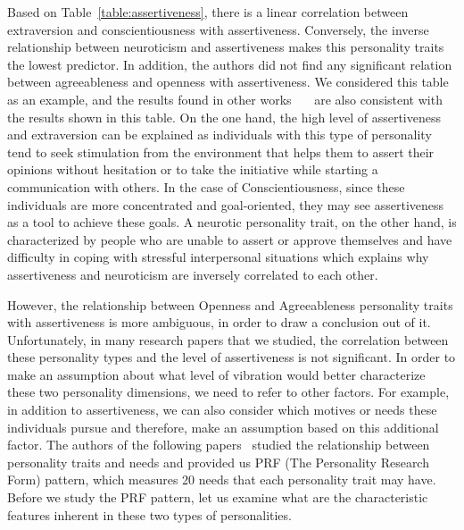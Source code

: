 \par Based on Table~\ref{table:assertiveness}, there is a linear correlation between extraversion and conscientiousness with assertiveness. Conversely, the inverse relationship between neuroticism and assertiveness makes this personality traits the lowest predictor. In addition, the authors did not find any significant relation between agreeableness and openness with assertiveness. We considered this table as an example, and the results found in other works~\cite{kirst2011investigating}~\cite{ramanaiah1993neo}~\cite{lefevre1981assertiveness} are also consistent with the results shown in this table. On the one hand, the high level of assertiveness and extraversion can be explained as individuals with this type of personality tend to seek stimulation from the environment that helps them to assert their opinions without hesitation or to take the initiative while starting a communication with others. In the case of Conscientiousness, since these individuals are more concentrated and goal-oriented, they may see assertiveness as a tool to achieve these goals. A neurotic personality trait, on the other hand, is characterized by people who are unable to assert or approve themselves and have difficulty in coping with stressful interpersonal situations which explains why assertiveness and neuroticism are inversely correlated to each other.

\par However, the relationship between Openness and Agreeableness personality traits with assertiveness is more ambiguous, in order to draw a conclusion out of it. Unfortunately, in many research papers that we studied, the correlation between these personality types and the level of assertiveness is not significant.
In order to make an assumption about what level of vibration would better characterize these two personality dimensions, we need to refer to other factors.
For example, in addition to assertiveness, we can also consider which motives or needs these individuals pursue and therefore, make an assumption based on this additional factor.
The authors of the following papers~\cite{costa1988catalog} studied the relationship between personality traits and needs and provided us PRF (The Personality Research Form) pattern, which measures 20 needs that each personality trait may have.
Before we study the PRF pattern, let us examine what are the characteristic features inherent in these two types of personalities.

